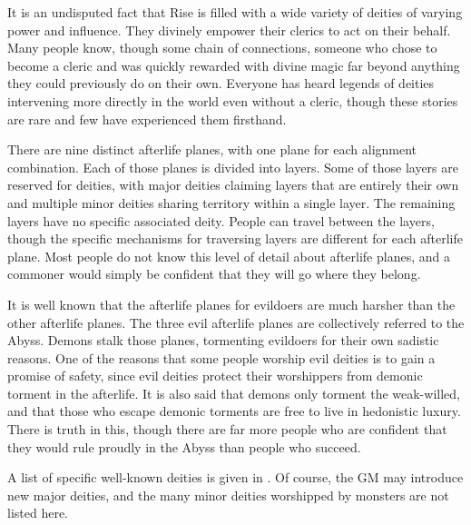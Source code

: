     It is an undisputed fact that Rise is filled with a wide variety of deities of varying power and influence.
    They divinely empower their clerics to act on their behalf.
    Many people know, though some chain of connections, someone who chose to become a cleric and was quickly rewarded with divine magic far beyond anything they could previously do on their own.
    Everyone has heard legends of deities intervening more directly in the world even without a cleric, though these stories are rare and few have experienced them firsthand.

    There are nine distinct afterlife planes, with one plane for each alignment combination.
    Each of those planes is divided into layers.
    Some of those layers are reserved for deities, with major deities claiming layers that are entirely their own and multiple minor deities sharing territory within a single layer.
    The remaining layers have no specific associated deity.
    People can travel between the layers, though the specific mechanisms for traversing layers are different for each afterlife plane.
    Most people do not know this level of detail about afterlife planes, and a commoner would simply be confident that they will go where they belong.

    It is well known that the afterlife planes for evildoers are much harsher than the other afterlife planes.
    The three evil afterlife planes are collectively referred to the Abyss.
    Demons stalk those planes, tormenting evildoers for their own sadistic reasons.
    One of the reasons that some people worship evil deities is to gain a promise of safety, since evil deities protect their worshippers from demonic torment in the afterlife.
    It is also said that demons only torment the weak-willed, and that those who escape demonic torments are free to live in hedonistic luxury.
    There is truth in this, though there are far more people who are confident that they would rule proudly in the Abyss than people who succeed.

    A list of specific well-known deities is given in .
    Of course, the GM may introduce new major deities, and the many minor deities worshipped by monsters are not listed here.

